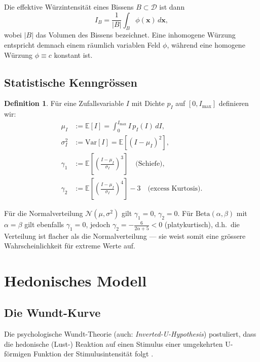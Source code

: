 ﻿\documentclass[12pt,a4paper]{article}
\theoremstyle{definition}
\newtheorem{definition}{Definition}[section]
\newcommand{\E}{\mathbb{E}}
\newcommand{\Var}{\mathrm{Var}}
\newcommand{\N}{\mathcal{N}}
\newcommand{\bx}{\mathbf{x}}
\begin{document}
Die effektive Würzintensität eines Bissens $B \subset \mathcal{D}$ ist
dann
\[
  I_B = \frac{1}{|B|} \int_B \phi(\bx)\, d\bx,
\]
wobei $|B|$ das Volumen des Bissens bezeichnet. Eine inhomogene Würzung
entspricht demnach einem räumlich variablen Feld $\phi$, während eine
homogene Würzung $\phi \equiv c$ konstant ist.

\subsection{Statistische Kenngrössen}

\begin{definition}
Für eine Zufallsvariable $I$ mit Dichte $p_I$ auf $[0, I_{\max}]$
definieren wir:
\begin{align}
  \mu_I &:= \E[I] = \int_0^{I_{\max}} I\, p_I(I)\, dI, \\
  \sigma_I^2 &:= \Var[I] = \E[(I - \mu_I)^2], \\
  \gamma_1 &:= \E\!\left[\left(\frac{I-\mu_I}{\sigma_I}\right)^3\right]
             \quad \text{(Schiefe)}, \\
  \gamma_2 &:= \E\!\left[\left(\frac{I-\mu_I}{\sigma_I}\right)^4\right] - 3
             \quad \text{(excess Kurtosis)}.
\end{align}
\end{definition}

Für die Normalverteilung $\N(\mu, \sigma^2)$ gilt
$\gamma_1 = 0$, $\gamma_2 = 0$. Für $\mathrm{Beta}(\alpha, \beta)$ mit
$\alpha = \beta$ gilt ebenfalls $\gamma_1 = 0$, jedoch
$\gamma_2 = -\tfrac{6}{2\alpha + 5} < 0$ (platykurtisch), d.h.\ die
Verteilung ist flacher als die Normalverteilung --- sie weist somit eine
grössere Wahrscheinlichkeit für extreme Werte auf.

\section{Hedonisches Modell}\label{sec:hedonik}

\subsection{Die Wundt-Kurve}

Die psychologische Wundt-Theorie (auch: \emph{Inverted-U-Hypothesis})
postuliert, dass die hedonische (Lust-) Reaktion auf einen Stimulus
einer umgekehrten U-förmigen Funktion der Stimulusintensität folgt
\cite{berlyne1970,wundt1874}.
\end{document}
